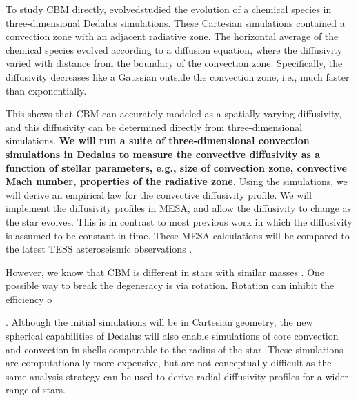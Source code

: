 To study CBM directly, \citet{Lecoanet_2016a} evolvedstudied the evolution of a chemical species in three-dimensional Dedalus simulations.  These Cartesian simulations contained a convection zone with an adjacent radiative zone. The horizontal average of the chemical species evolved according to a diffusion equation, where the diffusivity varied with distance from the boundary of the convection zone. Specifically, the diffusivity decreases like a Gaussian outside the convection zone, i.e., much faster than exponentially.

This shows that CBM can accurately modeled as a spatially varying diffusivity, and this diffusivity can be determined directly from three-dimensional simulations. \textbf{We will run a suite of three-dimensional convection simulations in Dedalus to measure the convective diffusivity as a function of stellar parameters, e.g., size of convection zone, convective Mach number, properties of the radiative zone.} Using the simulations, we will derive an empirical law for the convective diffusivity profile. We will implement the diffusivity profiles in MESA, and allow the diffusivity to change as the star evolves. This is in contrast to most previous work in which the diffusivity is assumed to be constant in time. These MESA calculations will be compared to the latest TESS asteroseismic observations \citep[similar to][]{Ghasemi_2016}.

However, we know that CBM is different in stars with similar masses \citep{Stancliffe_2015}. One possible way to break the degeneracy is via rotation. Rotation can inhibit the efficiency o

. Although the initial simulations will be in Cartesian geometry, the new spherical capabilities of Dedalus will also enable simulations of core convection and convection in shells comparable to the radius of the star. These simulations are computationally more expensive, but are not conceptually difficult as the same analysis strategy can be used to derive radial diffusivity profiles for a wider range of stars.
